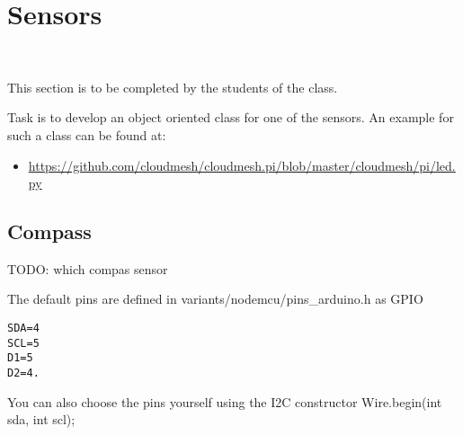 

\section{Sensors}\label{sensors}

\FILENAME\

This section is to be completed by the students of the class.

Task is to develop an object oriented class for one of the sensors. An
example for such a class can be found at:

\begin{itemize}

\item
  \url{https://github.com/cloudmesh/cloudmesh.pi/blob/master/cloudmesh/pi/led.py}
\end{itemize}

\subsection{Compass}\label{compass}

TODO: which compas sensor

The default pins are defined in variants/nodemcu/pins\_arduino.h as GPIO

\begin{verbatim}
SDA=4 
SCL=5
D1=5 
D2=4.
\end{verbatim}

You can also choose the pins yourself using the I2C constructor
Wire.begin(int sda, int scl);
